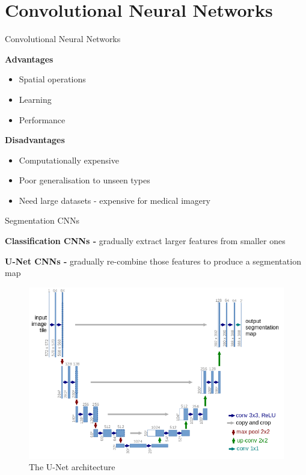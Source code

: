 \documentclass[10pt]{beamer}
\begin{document}
\section{Convolutional Neural Networks}

\begin{frame}[fragile]{Convolutional Neural Networks}

  \textbf{Advantages}
  \begin{itemize}
  \item Spatial operations
  \item Learning
  \item Performance
  \end{itemize}

  \textbf{Disadvantages}
  \begin{itemize}
  \item Computationally expensive
  \item Poor generalisation to unseen types
  \item Need large datasets - expensive for medical imagery
  \end{itemize}
  
\end{frame}

\begin{frame}[fragile]{Segmentation CNNs}
  
  \textbf{Classification CNNs -} gradually extract larger features from smaller ones
  \pause
  
  \textbf{U-Net CNNs -} gradually re-combine those features to produce a segmentation map

  \begin{figure}[h!]
    \centering
    \includegraphics[scale=0.25]{pictures/U-Net}
    \caption{The U-Net architecture \cite{uNet}}
    \label{fig:minCut}
  \end{figure}

\end{frame}
\end{document}
